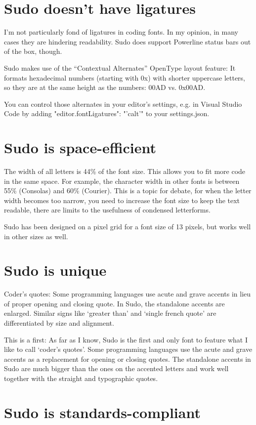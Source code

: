 \documentclass[paper=a4, 10pt]{scrbook}
\begin{document}
\section{Sudo doesn’t have ligatures}
I’m not particularly fond of ligatures in coding fonts. In my opinion, in many cases they are hindering readability. Sudo does support Powerline status bars out of the box, though.

Sudo makes use of the “Contextual Alternates” OpenType layout feature: It formats hexadecimal numbers (starting with 0x) with shorter uppercase letters, so they are at the same height as the numbers: 00AD vs. 0x00AD.

You can control those alternates in your editor’s settings, e.g. in Visual Studio Code by adding "editor.fontLigatures": "'calt'" to your settings.json.

\section{Sudo is space-efficient}

The width of all letters is 44\% of the font size. This allows you to fit more code in the same space. For example, the character width in other fonts is between 55\% (Consolas) and 60\% (Courier). This is a topic for debate, for when the letter width becomes too narrow, you need to increase the font size to keep the text readable, there are limits to the usefulness of condensed letterforms.

Sudo has been designed on a pixel grid for a font size of 13 pixels, but works well in other sizes as well.

\section{Sudo is unique}
Coder’s quotes: Some programming languages use acute and grave accents in lieu of proper opening and closing quote. In Sudo, the standalone accents are enlarged. Similar signs like ‘greater than’ and ‘single french quote’ are differentiated by size and alignment.

This is a first: As far as I know, Sudo is the first and only font to feature what I like to call ‘coder’s quotes’. Some programming languages use the acute and grave accents as a replacement for opening or closing quotes. The standalone accents in Sudo are much bigger than the ones on the accented letters and work well together with the straight and typographic quotes.

\section{Sudo is standards-compliant}
\end{document}
